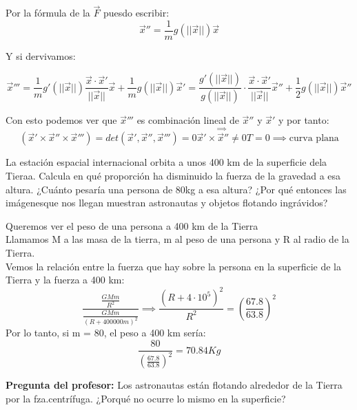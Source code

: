 \begin{problem}[1]
	Por la fórmula de la $\overrightarrow F$ puesdo escribir:
	$$\overrightarrow x'' = \frac{1}{m} g(||\overrightarrow x||)\overrightarrow x $$

	Y si dervivamos:

	$$\overrightarrow x''' = \frac{1}{m} g'(||\overrightarrow x||) \frac{\overrightarrow x \cdot \overrightarrow x'}{||\overrightarrow x||} \overrightarrow x + \frac{1}{m}g(||\overrightarrow x||)\overrightarrow x' = \frac{g'(||\overrightarrow x||)}{g(||\overrightarrow x||)}\cdot \frac{\overrightarrow x \cdot \overrightarrow x'}{||\overrightarrow x||} \overrightarrow x'' + \frac{1}{2}g(||\overrightarrow x||) \overrightarrow x''$$

	Con esto podemos ver que $\overrightarrow x'''$ es combinación lineal de $\overrightarrow x''$ y $\overrightarrow x'$ y por tanto:
	$$(\overrightarrow x' \times \overrightarrow x'' \times \overrightarrow x''') = det(\overrightarrow x', \overrightarrow x'',\overrightarrow x''') = 0 \stackrel{\implies}{\overrightarrow x' \times \overrightarrow x'' \neq 0} T = 0 \implies \text{curva plana}$$
\end{problem}

\begin{problem}[2]

La estación espacial internacional orbita a unos 400 km de la superficie dela Tieraa. Calcula en qué proporción ha disminuido la fuerza de la gravedad a esa altura. ¿Cuánto pesaría una persona de 80kg a esa altura? ¿Por qué entonces las imágenesque nos llegan muestran astronautas y objetos flotando ingrávidos?

\solution
	Queremos ver el peso de una persona a 400 km de la Tierra\\Llamamos M a las masa de la tierra, m al peso de una persona y R al radio de la Tierra.\\ Vemos la relación entre la fuerza que hay sobre la persona en la superficie de la Tierra y la fuerza a 400 km:\\
	$$\frac{\frac{GMm}{R^2}}{\frac{GMm}{(R + 400000 m)^2}} \implies \frac{(R + 4\cdot 10^5)^2}{R^2} = \left(\frac{67.8}{63.8}\right)^2$$
	Por lo tanto, si m = 80, el peso a 400 km sería:
	$$\frac{80}{\left(\frac{67.8}{63.8}\right)^2} = 70 .84 Kg$$

	\textbf{Pregunta del profesor:} Los astronautas están flotando alrededor de la Tierra por la fza.centrífuga. ¿Porqué no ocurre lo mismo en la superficie?
\end{problem}

